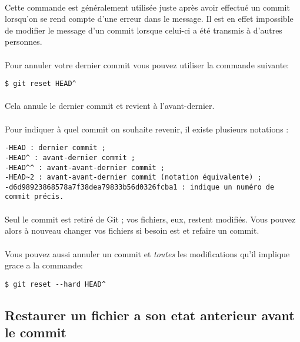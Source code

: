\documentclass[french, a4paper, 12pt, titlepage]{article}
\begin{document}
\paragraph{}Cette commande est généralement utilisée juste après avoir effectué un commit lorsqu’on se rend compte d’une erreur dans le message. Il est en effet impossible de modifier le message d’un commit lorsque celui-ci a été transmis à d’autres personnes.
\paragraph{}Pour annuler votre dernier commit vous pouvez utiliser la commande suivante:
\begin{lstlisting}
$ git reset HEAD^
\end{lstlisting}
\paragraph{}Cela annule le dernier commit et revient à l’avant-dernier.
\paragraph{}Pour indiquer à quel commit on souhaite revenir, il existe plusieurs notations :
\begin{lstlisting}
-HEAD : dernier commit ;
-HEAD^ : avant-dernier commit ;
-HEAD^^ : avant-avant-dernier commit ;
-HEAD~2 : avant-avant-dernier commit (notation équivalente) ;
-d6d98923868578a7f38dea79833b56d0326fcba1 : indique un numéro de commit précis.
\end{lstlisting}
\paragraph{}Seul le commit est retiré de Git ; vos fichiers, eux, restent modifiés. Vous pouvez alors à nouveau changer vos fichiers si besoin est et refaire un commit.
\paragraph{}Vous pouvez aussi annuler un commit et \emph{toutes} les modifications qu'il implique grace a la commande:
\begin{lstlisting}
$ git reset --hard HEAD^
\end{lstlisting}

\subsection{Restaurer un fichier a son etat anterieur avant le commit}
\end{document}
